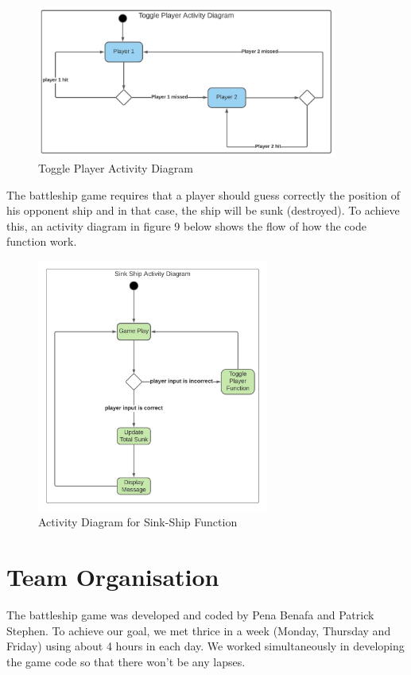 \documentclass[12pt]{article}
\begin{document}
\begin{figure}[H]
    \centering
    \includegraphics[width=0.88\textwidth]{HEL_template/figures/ToggleP.jpeg}
    \caption{Toggle Player Activity Diagram}
    \label{toggle}
\end{figure}

The battleship game requires that a player should guess correctly the position of his opponent ship and in that case, the ship will be sunk (destroyed). To achieve this, an activity diagram in figure 9 below shows the flow of how the code function work.

\begin{figure}[H]
    \centering
    \includegraphics[width=0.68\textwidth]{HEL_template/figures/SinkShip.jpeg}
    \caption{Activity Diagram for Sink-Ship Function}
    \label{Sinkship}
\end{figure}

\section{Team Organisation}
The battleship game was developed and coded by Pena Benafa and Patrick Stephen. To achieve our goal, we met thrice in a week (Monday, Thursday and Friday) using about 4 hours in each day. We worked simultaneously in developing the game code so that there won't be any lapses.
\end{document}
